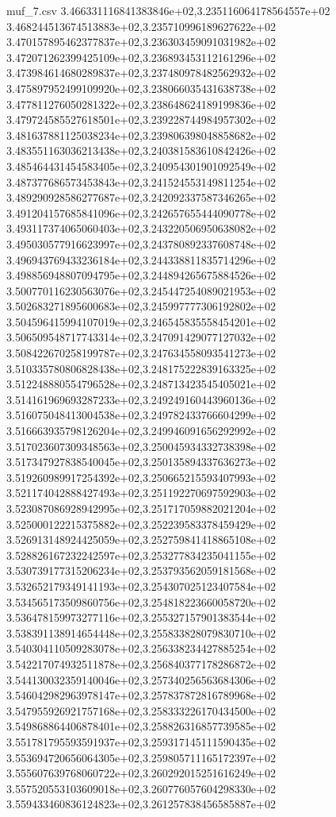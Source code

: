 \begin{filecontents*}{muf_7.csv}
3.466331116841383846e+02,3.235116064178564557e+02
3.468244513674513883e+02,3.235710996189627622e+02
3.470157895462377837e+02,3.236303459091031982e+02
3.472071262399425109e+02,3.236893453112161296e+02
3.473984614680289837e+02,3.237480978482562932e+02
3.475897952499109920e+02,3.238066035431638738e+02
3.477811276050281322e+02,3.238648624189199836e+02
3.479724585527618501e+02,3.239228744984957302e+02
3.481637881125038234e+02,3.239806398048858682e+02
3.483551163036213438e+02,3.240381583610842426e+02
3.485464431454583405e+02,3.240954301901092549e+02
3.487377686573453843e+02,3.241524553149811254e+02
3.489290928586277687e+02,3.242092337587346265e+02
3.491204157685841096e+02,3.242657655444090778e+02
3.493117374065060403e+02,3.243220506950638082e+02
3.495030577916623997e+02,3.243780892337608748e+02
3.496943769433236184e+02,3.244338811835714296e+02
3.498856948807094795e+02,3.244894265675884526e+02
3.500770116230563076e+02,3.245447254089021953e+02
3.502683271895600683e+02,3.245997777306192802e+02
3.504596415994107019e+02,3.246545835558454201e+02
3.506509548717743314e+02,3.247091429077127032e+02
3.508422670258199787e+02,3.247634558093541273e+02
3.510335780806828438e+02,3.248175222839163325e+02
3.512248880554796528e+02,3.248713423545405021e+02
3.514161969693287233e+02,3.249249160443960136e+02
3.516075048413004538e+02,3.249782433766604299e+02
3.516663935798126204e+02,3.249946091656292992e+02
3.517023607309348563e+02,3.250045934332738398e+02
3.517347927838540045e+02,3.250135894337636273e+02
3.519260989917254392e+02,3.250665215593407993e+02
3.521174042888427493e+02,3.251192270697592903e+02
3.523087086928942995e+02,3.251717059882021204e+02
3.525000122215375882e+02,3.252239583378459429e+02
3.526913148924425059e+02,3.252759841418865108e+02
3.528826167232242597e+02,3.253277834235041155e+02
3.530739177315206234e+02,3.253793562059181568e+02
3.532652179349141193e+02,3.254307025123407584e+02
3.534565173509860756e+02,3.254818223660058720e+02
3.536478159973277116e+02,3.255327157901383544e+02
3.538391138914654448e+02,3.255833828079830710e+02
3.540304110509283078e+02,3.256338234427885254e+02
3.542217074932511878e+02,3.256840377178286872e+02
3.544130032359140046e+02,3.257340256563684306e+02
3.546042982963978147e+02,3.257837872816789968e+02
3.547955926921757168e+02,3.258333226170434500e+02
3.549868864406878401e+02,3.258826316857739585e+02
3.551781795593591937e+02,3.259317145111590435e+02
3.553694720656064305e+02,3.259805711165172397e+02
3.555607639768060722e+02,3.260292015251616249e+02
3.557520553103609018e+02,3.260776057604298330e+02
3.559433460836124823e+02,3.261257838456585887e+02

\end{filecontents*}
